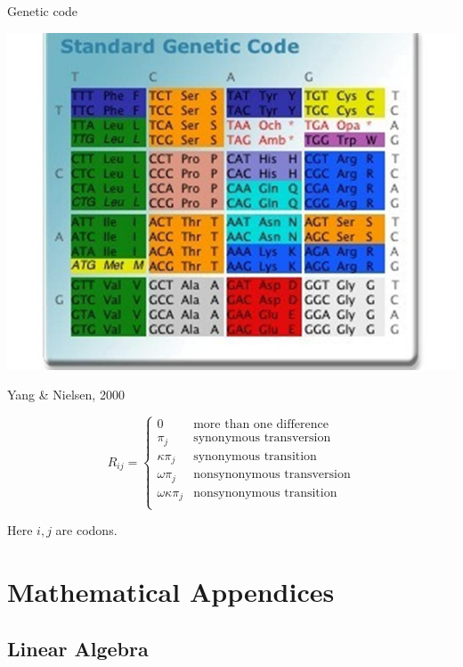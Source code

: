 \documentclass{beamer}
\begin{document}
\begin{frame}{Genetic code}

  \includegraphics[width=.8\textwidth]{genetic_code.jpg}

\end{frame}


\begin{frame}{Yang \& Nielsen, 2000}

\[
R_{ij} = \left\{ \begin{array}{ll}
0 & \mbox{more than one difference} \\
\pi_j & \mbox{synonymous transversion} \\
\kappa \pi_j & \mbox{synonymous transition } \\
\omega \pi_j & \mbox{nonsynonymous transversion} \\
\omega \kappa \pi_j & \mbox{nonsynonymous transition} \\
\end{array} \right.
\]

Here $i,j$ are codons.

\end{frame}


\section{Mathematical Appendices}

\subsection{Linear Algebra}
\end{document}
